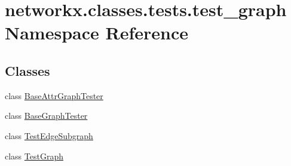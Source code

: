 \hypertarget{namespacenetworkx_1_1classes_1_1tests_1_1test__graph}{}\section{networkx.\+classes.\+tests.\+test\+\_\+graph Namespace Reference}
\label{namespacenetworkx_1_1classes_1_1tests_1_1test__graph}
\subsection*{Classes}
\begin{DoxyCompactItemize}
\item 
class \hyperlink{classnetworkx_1_1classes_1_1tests_1_1test__graph_1_1BaseAttrGraphTester}{Base\+Attr\+Graph\+Tester}
\item 
class \hyperlink{classnetworkx_1_1classes_1_1tests_1_1test__graph_1_1BaseGraphTester}{Base\+Graph\+Tester}
\item 
class \hyperlink{classnetworkx_1_1classes_1_1tests_1_1test__graph_1_1TestEdgeSubgraph}{Test\+Edge\+Subgraph}
\item 
class \hyperlink{classnetworkx_1_1classes_1_1tests_1_1test__graph_1_1TestGraph}{Test\+Graph}
\end{DoxyCompactItemize}
